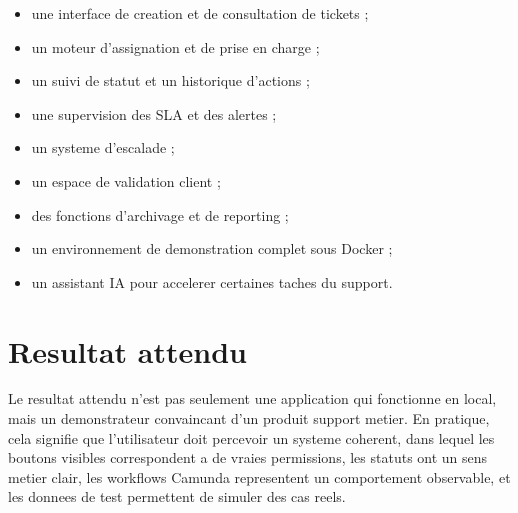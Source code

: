 \begin{itemize}[leftmargin=1.2cm]
  \item une interface de creation et de consultation de tickets ;
  \item un moteur d'assignation et de prise en charge ;
  \item un suivi de statut et un historique d'actions ;
  \item une supervision des SLA et des alertes ;
  \item un systeme d'escalade ;
  \item un espace de validation client ;
  \item des fonctions d'archivage et de reporting ;
  \item un environnement de demonstration complet sous Docker ;
  \item un assistant IA pour accelerer certaines taches du support.
\end{itemize}

\section{Resultat attendu}

Le resultat attendu n'est pas seulement une application qui fonctionne en local, mais un demonstrateur convaincant d'un produit support metier. En pratique, cela signifie que l'utilisateur doit percevoir un systeme coherent, dans lequel les boutons visibles correspondent a de vraies permissions, les statuts ont un sens metier clair, les workflows Camunda representent un comportement observable, et les donnees de test permettent de simuler des cas reels.


